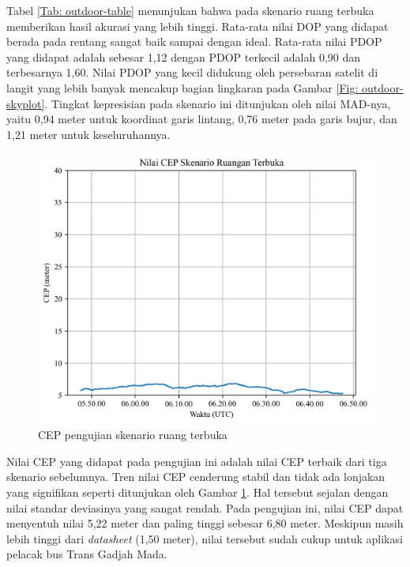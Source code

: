 Tabel \ref{Tab: outdoor-table} menunjukan bahwa pada skenario ruang terbuka memberikan hasil akurasi yang lebih tinggi. Rata-rata nilai DOP yang didapat berada pada rentang sangat baik sampai dengan ideal. Rata-rata nilai PDOP yang didapat adalah sebesar 1,12 dengan PDOP terkecil adalah 0,90 dan terbesarnya 1,60. Nilai PDOP yang kecil didukung oleh persebaran satelit di langit yang lebih banyak mencakup bagian lingkaran pada Gambar \ref{Fig: outdoor-skyplot}. Tingkat kepresisian pada skenario ini ditunjukan oleh nilai MAD-nya, yaitu 0,94 meter untuk koordinat garis lintang, 0,76 meter pada garis bujur, dan 1,21 meter untuk keseluruhannya.

\begin{figure}[H]
	\centering
	\includegraphics[width=13cm]{contents/chapter-4/4-skenario-outdoor/cep.png}
	\caption{CEP pengujian skenario ruang terbuka}
	\label{Fig: outdoor-cep}
\end{figure}

Nilai CEP yang didapat pada pengujian ini adalah nilai CEP terbaik dari tiga skenario sebelumnya. Tren nilai CEP cenderung stabil dan tidak ada lonjakan yang signifikan seperti ditunjukan oleh Gambar \ref{Fig: outdoor-cep}. Hal tersebut sejalan dengan nilai standar deviasinya yang sangat rendah. Pada pengujian ini, nilai CEP dapat menyentuh nilai 5,22 meter dan paling tinggi sebesar 6,80 meter. Meskipun masih lebih tinggi dari \textit{datasheet} (1,50 meter), nilai tersebut sudah cukup untuk aplikasi pelacak bus Trans Gadjah Mada.

